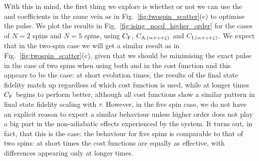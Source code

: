 With this in mind, the first thing we explore is whether or not we can use the  and   coefficients in the same vein as in Fig.~\ref{fig:twospin_scatter}(c) to optimise the  pulse. We plot the results in Fig.~\ref{fig:ising_nocd_higher_order} for the cases of $N=2$ spins and $N=5$ spins, using $C_{\rm F}$, $C_{\rm A, (\alpha + \gamma +\zeta)}$ and $C_{\rm I, (\alpha + \gamma +\zeta)}$. We expect that in the two-spin case we will get a similar result as in Fig.~\ref{fig:twospin_scatter}(c), given that we should be minimising the exact  pulse in the case of two spins when using both  and  in the cost function and this appears to be the case: at short evolution times, the results of the final state fidelity match up regardless of which cost function is used, while at longer times $C_{\rm F}$ begins to perform better, although all cost functions show a similar pattern in final state fidelity scaling with $\tau$. However, in the five spin case, we do not have an explicit reason to expect a similar behaviour unless higher order  does not play a big part in the non-adiabatic effects experienced by the system. It turns out, in fact, that this is the case: the behaviour for five spins is comparable to that of two spins: at short times the cost functions are equally as effective, with differences appearing only at longer times. 

